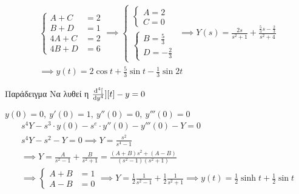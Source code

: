\documentclass[11pt,a4paper,titlepage,draft]{article}
\begin{document}
\begin{align*}
\begin{cases}
A + C &= 2 \\
B + D &= 1 \\
4A + C &= 2 \\
4B + D &= 6
\end{cases} \implies
\begin{cases}
\begin{cases}
A = 2 \\ C = 0
\end{cases} \\
\begin{cases}
B = \frac{5}{3} \\
D = -\frac{2}{3}
\end{cases}
\end{cases} \implies Y(s) = \frac{2s}{s^2+1} + \frac{\frac{5}{3}s-\frac{2}{3}}{s^2+4} \\
\implies \boxed{
	y(t) = 2\cos t + \frac{5}{3}\sin t - \frac{1}{3}\sin 2t
	}
\end{align*}

\begin{exercise*}{Παράδειγμα}
Να λυθεί η \( \od[4][y][t] -y = 0 \)

\( y(0)=0,\ y'(0)=1,\ y''(0)=0,\ y'''(0)=0 \)
\tcblower
\begin{align*}
s^4Y-s^3\cdot y(0)-s^e\cdot y''(0)-y'''(0)-Y = 0 \\
s^4Y -s^2-Y = 0 \implies Y = \frac{s^2}{s^4-1} \\
\implies Y = \frac{A}{s^2-1} + \frac{B}{s^2+1} = \frac{(A+B)s^2+(A-B)}{(s^2-1)(s^2+1)} \\
\implies \begin{cases}
A+B &= 1 \\ A-B &= 0
\end{cases}
\implies Y = \frac{1}{2}\frac{1}{s^2-1}+\frac{1}{2}\frac{1}{s^2+1} \implies y(t) = \frac{1}{2}\sinh t+ \frac{1}{2} \sin t
\end{align*}
\end{exercise*}
\end{document}
